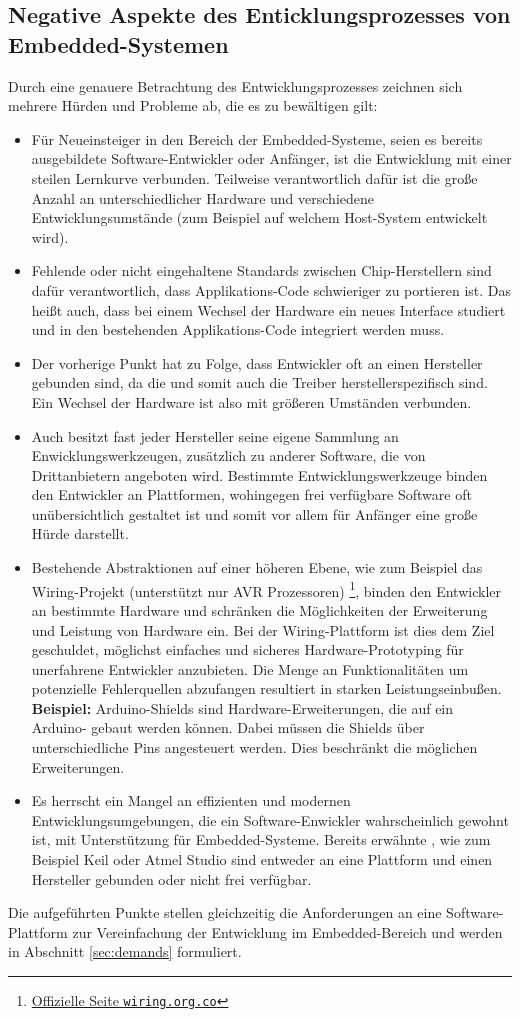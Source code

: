 	\subsection{Negative Aspekte des Enticklungsprozesses von Embedded\hyp{}Systemen}
	\label{sec:probleme}
	Durch eine genauere Betrachtung des Entwicklungsprozesses zeichnen sich mehrere Hürden und Probleme ab, die es zu
	bewältigen gilt:
	\begin{itemize}
	    \item Für Neueinsteiger in den Bereich der Embedded-Systeme, seien es bereits ausgebildete Software-Entwickler
	    oder Anfänger, ist die Entwicklung mit einer steilen Lernkurve verbunden. Teilweise verantwortlich
	    dafür ist die große Anzahl an unterschiedlicher Hardware und verschiedene Entwicklungsumstände (zum Beispiel
	    auf welchem Host-System entwickelt wird).
	    \item Fehlende oder nicht eingehaltene Standards zwischen Chip-Herstellern sind dafür verantwortlich, dass
	    Applikations-Code schwieriger zu portieren ist. Das heißt auch, dass bei einem Wechsel der Hardware ein neues
	    Interface studiert und in den bestehenden Applikations-Code integriert werden muss.
	    \item Der vorherige Punkt hat zu Folge, dass Entwickler oft an einen Hersteller gebunden sind, da die
	     und somit auch die Treiber herstellerspezifisch sind. Ein Wechsel der
	    Hardware ist also mit größeren Umständen verbunden.
	    \item Auch besitzt fast jeder Hersteller seine eigene Sammlung an Enwicklungswerkzeugen, zusätzlich zu anderer
	    Software, die von Drittanbietern angeboten wird. Bestimmte Entwicklungswerkzeuge binden den Entwickler an
	    Plattformen, wohingegen frei verfügbare Software oft unübersichtlich gestaltet ist und somit vor allem für
	    Anfänger eine große Hürde darstellt.
	    \item Bestehende Abstraktionen auf einer höheren Ebene, wie zum Beispiel das Wiring-Projekt (unterstützt nur
	    AVR Prozessoren) \footnote{\href{http://www.wiring.org.co/}{Offizielle Seite \texttt{wiring.org.co}}}, binden den Entwickler an
	    bestimmte Hardware und schränken die Möglichkeiten der Erweiterung und Leistung von Hardware ein. Bei der
	    Wiring-Plattform ist dies dem Ziel geschuldet, möglichst einfaches und sicheres Hardware-Prototyping für unerfahrene
	    Entwickler anzubieten. Die Menge an Funktionalitäten um potenzielle Fehlerquellen abzufangen resultiert in
	    starken Leistungseinbußen.\\
	    \textbf{Beispiel:} Arduino-Shields sind Hardware-Erweiterungen, die auf ein Arduino- gebaut werden können.
	    Dabei müssen die Shields über unterschiedliche Pins angesteuert werden. Dies beschränkt die möglichen
	    Erweiterungen.
	    \item Es herrscht ein Mangel an effizienten und modernen Entwicklungsumgebungen, die ein Software-Enwickler
	    wahrscheinlich gewohnt ist, mit Unterstützung für Embedded-Systeme. Bereits erwähnte , wie zum Beispiel
	    Keil oder Atmel Studio sind entweder an eine Plattform und einen Hersteller gebunden oder nicht frei verfügbar.
	\end{itemize}

    Die aufgeführten Punkte stellen gleichzeitig die Anforderungen an eine Software-Plattform zur Vereinfachung der
    Entwicklung im Embedded-Bereich und werden in Abschnitt \ref{sec:demands} formuliert.

